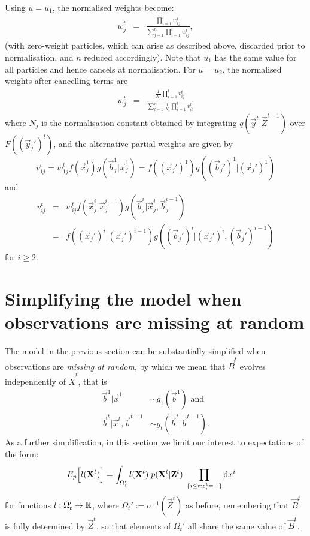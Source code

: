 Using $u = u_1$, the normalised weights become:
\begin{eqnarray*}
w^{t}_j &=& \frac{\prod_{i=1}^t w^{t}_{ij}}{\sum_{j=1}^n \prod_{i=1}^t w^{t}_{ij}},
\end{eqnarray*}
(with zero-weight particles, which can arise as described above, discarded prior to normalisation, and $n$ reduced accordingly). Note that $u_1$ has the same value for all particles and hence cancels at normalisation.
For $u = u_2$, the normalised weights after cancelling terms are
\begin{eqnarray*}
w^{t}_j &=& \frac{\frac{1}{N_j} \prod_{i=1}^t v^{t}_{ij}}{\sum_{l=1}^n \frac{1}{N_l}\prod_{i=1}^t v^{t}_{il}}
\end{eqnarray*}
where $N_j$ is the normalisation constant obtained by integrating $q(\vec{y}^{t} | \vec{Z}^{t-1})$ over $F((\vec{y}_j')^{t})$, and the alternative partial weights are given by
\[
v^{t}_{1j} = w^{t}_{1j} f(\vec{x}_j^1)g(\vec{b}_j^1 | \vec{x}_j^1) = f((\vec{x}_j')^1)g((\vec{b}_j')^1 | (\vec{x}_j')^1)
\]
and
\begin{eqnarray*}
v^{t}_{ij} &=& w^{t}_{ij} f(\vec{x}_j^i | \vec{x}_j^{i-1}) g(\vec{b}_j^i | \vec{x}_j^i, \vec{b}_j^{i-1}) \\
&=& f((\vec{x}_j')^i | (\vec{x}_j')^{i-1}) g((\vec{b}_j')^i | (\vec{x}_j')^i, (\vec{b}_j')^{i-1})
\end{eqnarray*}
for $i \geq 2$. 




\section{Simplifying the model when observations are missing at random}

The model in the previous section can be substantially simplified when observations are {\em missing at random}, by which we mean that $\vec{B}^t$ evolves independently of $\vec{X}^t$, that is 
\begin{align*}
    \vec{b}^1 | \vec{x}^1 &\sim g_1(\vec{b}^1 ) \mbox{ and } \\
    \vec{b}^t | \vec{x}^t, \vec{b}^{t-1} &\sim g_t(\vec{b}^t | \vec{b}^{t-1}).
\end{align*}
As a further simplification, in this section we limit our interest to expectations of the form:
\begin{align*}
    E_{p} \Big[l(\mathbf{X}^{t}) \Big] &=  \int_{\Omega_t'} l(\mathbf{X}^{t})\; p(\mathbf{X}^{t} | \mathbf{Z}^{t})\; \prod_{ \{ i \leq t  : z^t_{i} = - \} } \mathrm{d} x^i
\end{align*}
for functions $l: \Omega_t'  \rightarrow \mathbb R$, where $\Omega_t' := \sigma^{-1}(\vec{Z}^{t})$ as before, remembering that $\vec{B}^{t}$ is fully determined by $\vec{Z}^{t}$, so that elements of $\Omega_t'$ all share the same value of $\vec{B}^{t}$. 

